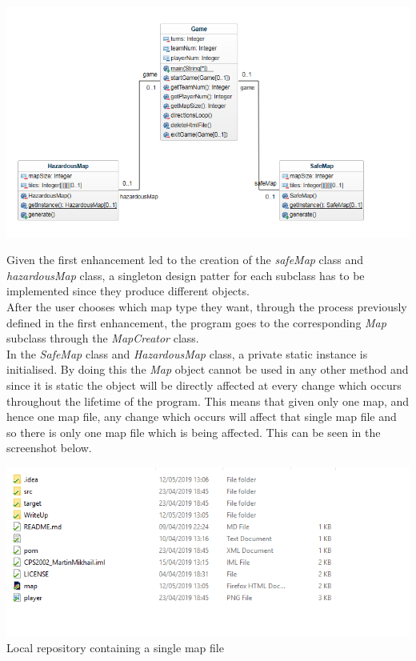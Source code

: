\documentclass[a4paper,12pt]{extarticle}
\begin{document}
\begin{center}
\includegraphics[width=\textwidth]{Enhancement2CD.png}\\
\end{center}

\noindent Given the first enhancement led to the creation of the \textit{safeMap} class and \textit{hazardousMap} class, a singleton design patter for each subclass has to be implemented since they produce different objects.\\

\noindent After the user chooses which map type they want, through the process previously defined in the first enhancement, the program goes to the corresponding \textit{Map} subclass through the \textit{MapCreator} class.\\ 

\noindent In the \textit{SafeMap} class and \textit{HazardousMap} class, a private static instance is initialised. By doing this the \textit{Map} object cannot be used in any other method and since it is static the object will be directly affected at every change which occurs throughout the lifetime of the program. This means that given only one map, and hence one map file, any change which occurs will affect that single map file and so there is only one map file which is being affected. This can be seen in the screenshot below.\\


\begin{center}
\includegraphics[width=\textwidth]{Singleton1.png}\\
Local repository containing a single map file
\end{center}
\end{document}
